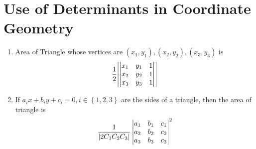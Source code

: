 \documentclass{article}
\begin{document}
\section{Use of Determinants in Coordinate Geometry}
\begin{enumerate}[1.]
    \item Area of Triangle whose vertices are $(x_{1},y_{1}), (x_{2},y_{2}),(x_{3},y_{3}) $ is 
    $$\dfrac{1}{2} \abs{\begin{vmatrix}
        x_{1} & y_{1} & 1 \\
        x_{2} & y_{2} & 1 \\
        x_{3} & y_{3} & 1
    \end{vmatrix}}$$
    \item If $a_{i}x+b_{i}y+c_{i}=0, i \in \left\{1,2,3\right\} $ are the sides of a triangle, then the area of triangle is 
    $$\dfrac{1}{\abs{2C_{1}C_{2}C_{3}}}\begin{vmatrix}
        a_{1} & b_{1} & c_{1} \\
        a_{2} & b_{2} & c_{2} \\
        a_{3} & b_{3} & c_{3} 
    \end{vmatrix}^2 \hfill $$
\end{enumerate}
\end{document}
